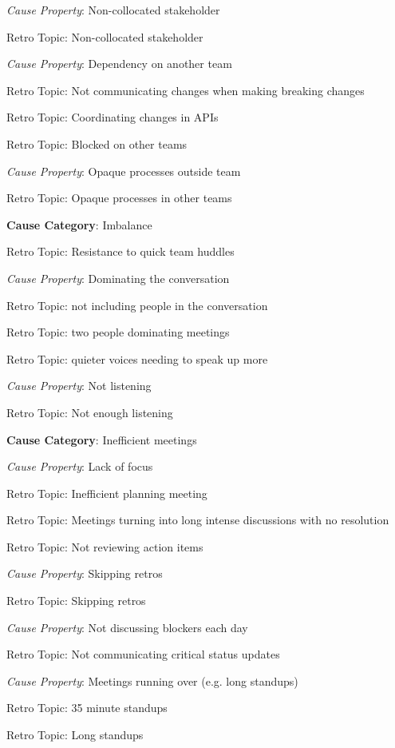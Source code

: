 \quad \quad \textit{Cause Property}: Non-collocated stakeholder

\quad \quad \quad Retro Topic: Non-collocated stakeholder

\quad \quad \textit{Cause Property}: Dependency on another team

\quad \quad \quad Retro Topic: Not communicating changes when making breaking changes

\quad \quad \quad Retro Topic: Coordinating changes in APIs

\quad \quad \quad Retro Topic: Blocked on other teams

\quad \quad \textit{Cause Property}: Opaque processes outside team

\quad \quad \quad Retro Topic: Opaque processes in other teams

\quad \textbf{Cause Category}: Imbalance

\quad \quad Retro Topic: Resistance to quick team huddles

\quad \quad \textit{Cause Property}: Dominating the conversation

\quad \quad \quad Retro Topic: not including people in the conversation

\quad \quad \quad Retro Topic: two people dominating meetings

\quad \quad \quad Retro Topic: quieter voices needing to speak up more

\quad \quad \textit{Cause Property}: Not listening

\quad \quad \quad Retro Topic: Not enough listening

\quad \textbf{Cause Category}: Inefficient meetings

\quad \quad \textit{Cause Property}: Lack of focus

\quad \quad \quad Retro Topic: Inefficient planning meeting

\quad \quad \quad Retro Topic: Meetings turning into long intense discussions with no resolution

\quad \quad \quad Retro Topic: Not reviewing action items

\quad \quad \textit{Cause Property}: Skipping retros

\quad \quad \quad Retro Topic: Skipping retros

\quad \quad \textit{Cause Property}: Not discussing blockers each day

\quad \quad \quad Retro Topic: Not communicating critical status updates

\quad \quad \textit{Cause Property}: Meetings running over (e.g. long standups)

\quad \quad \quad Retro Topic: 35 minute standups

\quad \quad \quad Retro Topic: Long standups

